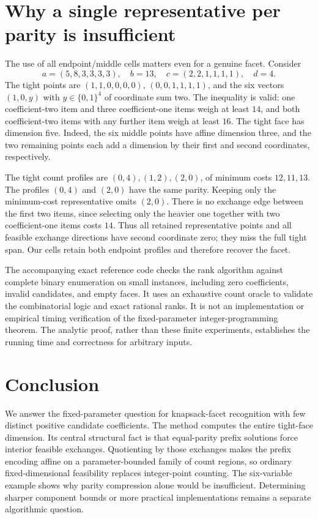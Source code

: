 \documentclass[11pt]{article}
\begin{document}
\section{Why a single representative per parity is insufficient}
The use of all endpoint/middle cells matters even for a genuine facet. Consider
\[
 a=(5,8,3,3,3,3),\quad b=13,\quad c=(2,2,1,1,1,1),\quad d=4.
\]
The tight points are $(1,1,0,0,0,0)$, $(0,0,1,1,1,1)$, and the six vectors $(1,0,y)$ with $y\in\{0,1\}^4$ of coordinate sum two. The inequality is valid: one coefficient-two item and three coefficient-one items weigh at least $14$, and both coefficient-two items with any further item weigh at least $16$. The tight face has dimension five. Indeed, the six middle points have affine dimension three, and the two remaining points each add a dimension by their first and second coordinates, respectively.

The tight count profiles are $(0,4),(1,2),(2,0)$, of minimum costs $12,11,13$. The profiles $(0,4)$ and $(2,0)$ have the same parity. Keeping only the minimum-cost representative omits $(2,0)$. There is no exchange edge between the first two items, since selecting only the heavier one together with two coefficient-one items costs $14$. Thus all retained representative points and all feasible exchange directions have second coordinate zero; they miss the full tight span. Our cells retain both endpoint profiles and therefore recover the facet.

The accompanying exact reference code checks the rank algorithm against complete binary enumeration on small instances, including zero coefficients, invalid candidates, and empty faces. It uses an exhaustive count oracle to validate the combinatorial logic and exact rational ranks. It is not an implementation or empirical timing verification of the fixed-parameter integer-programming theorem. The analytic proof, rather than these finite experiments, establishes the running time and correctness for arbitrary inputs.

\section{Conclusion}
We answer the fixed-parameter question for knapsack-facet recognition with few distinct positive candidate coefficients. The method computes the entire tight-face dimension. Its central structural fact is that equal-parity prefix solutions force interior feasible exchanges. Quotienting by those exchanges makes the prefix encoding affine on a parameter-bounded family of count regions, so ordinary fixed-dimensional feasibility replaces integer-point counting. The six-variable example shows why parity compression alone would be insufficient. Determining sharper component bounds or more practical implementations remains a separate algorithmic question.
\end{document}
